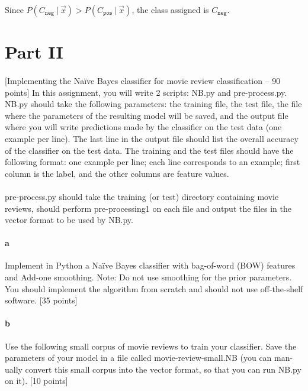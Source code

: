 \documentclass{article}
\newcommand\given[1][]{\ #1\vert\ }
\begin{document}
Since \(P(C_{\texttt{neg}} \given \vec{x}) > P(C_{\texttt{pos}} \given \vec{x})\), the class assigned is \(C_{\texttt{neg}}\).

\clearpage

\section*{Part II}

\paragraph{} [Implementing the Naïve Bayes classifier for movie review classification – 90 points] In this assignment, you will write 2 scripts: NB.py and pre-process.py. NB.py should take the following parameters: the training file, the test file, the file where the parameters of the resulting model will be saved, and the output file where you will write predictions made by the classifier on the test data (one example per line). The last line in the output file should list the overall accuracy of the classifier on the test data. The training and the test files should have the following format: one example per line; each line corresponds to an example; first column is the label, and the other columns are feature values.

\paragraph{} pre-process.py should take the training (or test) directory containing movie reviews, should perform pre-processing1 on each file and output the files in the vector format to be used by NB.py.

\paragraph{a} Implement in Python a Naïve Bayes classifier with bag-of-word (BOW) features and Add-one smoothing. Note: Do not use smoothing for the prior parameters. You should implement the algorithm from scratch and should not use off-the-shelf software. [35 points]

\paragraph{b} Use the following small corpus of movie reviews to train your classifier. Save the parameters of your model in a file called movie-review-small.NB (you can man- ually convert this small corpus into the vector format, so that you can run NB.py on it). [10 points]
\end{document}
